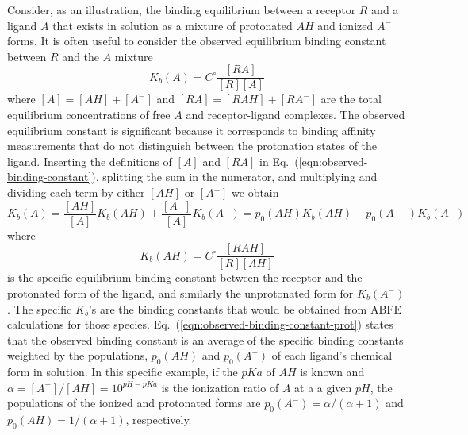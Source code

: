 \documentclass[9pt,bestpractices]{livecoms}
\begin{document}
Consider, as an illustration, the binding equilibrium between a receptor $R$ and a ligand $A$ that exists in solution as a mixture of protonated $AH$ and ionized $A^-$ forms. It is often useful to consider the observed equilibrium binding constant between $R$ and the $A$ mixture 
\begin{equation}
  K_b(A) = C^\circ \frac{[RA]}{[R][A]}
  \label{eqn:observed-binding-constant}
\end{equation}
where $[A] = [AH] + [A^-]$ and $[RA] = [RAH] + [RA^-]$ are the total equilibrium concentrations of free $A$ and receptor-ligand complexes. The observed equilibrium constant is significant because it corresponds to binding affinity measurements that do not distinguish between the protonation states of the ligand. Inserting the definitions of $[A]$ and $[RA]$ in Eq.~(\ref{eqn:observed-binding-constant}), splitting the sum in the numerator, and multiplying and dividing each term by either $[AH]$ or $[A^-]$ we obtain
\begin{equation}
  K_b(A) = \frac{[AH]}{[A]}  K_b(AH) +  \frac{[A^-]}{[A]} K_b(A^-) =  p_0(AH) K_b(AH) +  p_0(A-) K_b(A^-)
  \label{eqn:observed-binding-constant-split}
\end{equation}
where
\begin{equation}
  K_b(AH) = C^\circ \frac{[RAH]}{[R][AH]}
  \label{eqn:observed-binding-constant-prot}
\end{equation}
is the specific equilibrium binding constant between the receptor and the protonated form of the ligand, and similarly the unprotonated form for $K_b(A^-)$. The specific $K_b$'s are the binding constants that would be obtained from ABFE calculations for those species. Eq.~(\ref{eqn:observed-binding-constant-prot}) states that the observed binding constant is an average of the specific binding constants weighted by the populations, $p_0(AH)$ and  $p_0(A^-)$ of each ligand's chemical form in solution. In this specific example, if the $pKa$ of $AH$ is known and $\alpha = [A^-]/[AH] = 10^{pH-pKa} $ is the ionization ratio of $A$ at a a given $pH$, the populations of the ionized and protonated forms are $p_0(A^-) = \alpha/(\alpha+1)$ and $p_0(AH) = 1/(\alpha+1)$, respectively.~\cite{champion2024multistate,azimi2022application}
\end{document}
